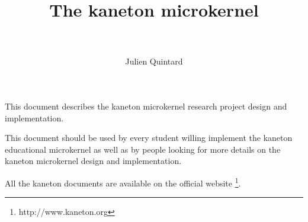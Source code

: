 %
%
%
%
%
%

%
%

%
%

\def\path{../..}

%
%



%
%

\rhead{}

%
%

\title{The kaneton microkernel \\
       \version \\
       \logos}

%
%

\author{\small{Julien Quintard}}

%
%



%
%

\maketitle

%
%

This document describes the kaneton microkernel research project design
and implementation.

\-

This document should be used by every student willing implement the
kaneton educational microkernel as well as by people looking for more
details on the kaneton microkernel design and implementation.

\-

All the kaneton documents are available on
the official website
  \footnote{http://www.kaneton.org}.

%
%

\toc

%
%











